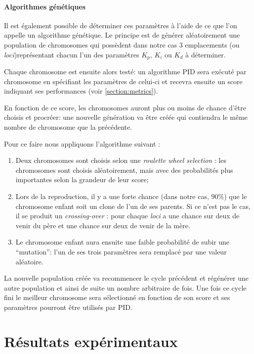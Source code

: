 \documentclass[a4paper,10pt]{report}
\begin{document}
\subsubsection{Algorithmes génétiques}
Il est également possible de déterminer ces paramètres à l'aide de ce que l'on appelle un algorithme génétique.
Le principe est de générer aléatoirement une population de chromosomes qui possèdent dans notre cas 3 emplacements (ou \textit{loci})représentant chacun l'un des paramètres $K_p$, $K_i$ ou $K_d$ à déterminer.

Chaque chromosome est ensuite alors testé: un algorithme PID sera exécuté par chromosome en spécifiant les paramètres de celui-ci et recevra ensuite un score indiquant ses performances (voir \ref{section:metrics}).

En fonction de ce score, les chromosomes auront plus ou moins de chance d'être choisis et procréer: une nouvelle génération va être créée qui contiendra le même nombre de chromosome que la précédente.

Pour ce faire nous appliquons l'algorithme suivant :
\begin{enumerate}
  \item Deux chromosomes sont choisis selon une \textit{roulette wheel selection} : les chromosomes sont choisis aléatoirement, mais avec des probabilités plus importantes selon la grandeur de leur score;
  \item Lors de la reproduction, il y a une forte chance (dans notre cas, 90\%) que le chromosome enfant soit un clone de l'un de ses parents. Si ce n'est pas le cas, il se produit un \textit{crossing-over} : pour chaque \textit{loci} a une chance sur deux de venir du père et une chance sur deux de venir de la mère.
  \item Le chromosome enfant aura ensuite une faible probabilité de subir une ``mutation'': l'un de ses trois paramètres sera remplacé par une valeur aléatoire.
\end{enumerate}

La nouvelle population créée va recommencer le cycle précédent et régénérer une autre population et ainsi de suite un nombre arbitraire de fois.
Une fois ce cycle fini le meilleur chromosome sera sélectionné en fonction de son score et ses paramètres pourront être utilisés par PID.


\chapter{Résultats expérimentaux}
\end{document}
